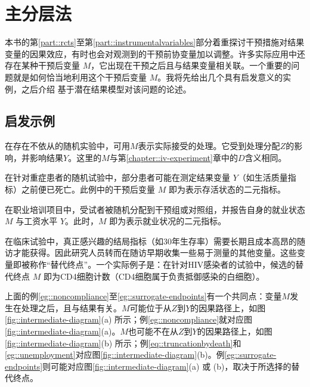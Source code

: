 
\chapter{主分层法}
 \label{chapter::principal-stratification}

本书的第\ref{part::rcts}至第\ref{part::instrumentalvariables}部分着重探讨干预措施对结果变量的因果效应，有时也会对观测到的干预前协变量加以调整。许多实际应用中还存在某种干预后变量 $M$，它出现在干预之后且与结果变量相关联。一个重要的问题就是如何恰当地利用这个干预后变量 $M$。我将先给出几个具有启发意义的实例，之后介绍 \citet{frangakis2002principal} 基于潜在结果模型对该问题的论述。 
 


\section{启发示例}



\begin{example}[不遵从干预者]\label{eg::noncompliance}
在存在不依从的随机实验中，可用$M$表示实际接受的处理。它受到处理分配$Z$的影响，并影响结果$Y$。这里的$M$与第\ref{chapter::iv-experiment}章中的$D$含义相同。
\end{example}


\begin{example}[因死亡导致的数据截断]\label{eq::truncationbydeath}
在针对重症患者的随机试验中，部分患者可能在测定结果变量 $Y$（如生活质量指标）之前便已死亡。此例中的干预后变量 $M$ 即为表示存活状态的二元指标。 
\end{example}




\begin{example}[失业问题]\label{eg::unemployment}
在职业培训项目中，受试者被随机分配到干预组或对照组，并报告自身的就业状态 $M$ 与工资水平 $Y$。此时，$M$ 即为表示就业状况的二元指标。 
\end{example}




\begin{example}
[替代终点]\label{eg::surrogate-endpoints}
在临床试验中，真正感兴趣的结局指标（如30年生存率）需要长期且成本高昂的随访才能获得。因此研究人员转而在随访早期收集一些易于测量的其他变量。这些变量即被称作“替代终点”。一个实际例子是：在针对HIV感染者的试验中，候选的替代终点 $M$ 即为CD4细胞计数（CD4细胞属于负责抵御感染的白细胞）。
\end{example}



上面的例\ref{eg::noncompliance}至\ref{eg::surrogate-endpoints}有一个共同点：变量$M$发生在处理之后，且与结果有关。$M$可能位于从$Z$到$Y$的因果路径上，如图\ref{fig::intermediate-diagram}(a) 所示；例\ref{eg::noncompliance}就对应图\ref{fig::intermediate-diagram}(a)。$M$也可能不在从$Z$到$Y$的因果路径上，如图\ref{fig::intermediate-diagram}(b) 所示；例\ref{eq::truncationbydeath}和\ref{eg::unemployment}对应图\ref{fig::intermediate-diagram}(b)。例\ref{eg::surrogate-endpoints}则可能对应图\ref{fig::intermediate-diagram}(a) 或 (b)，取决于所选择的替代终点。 

